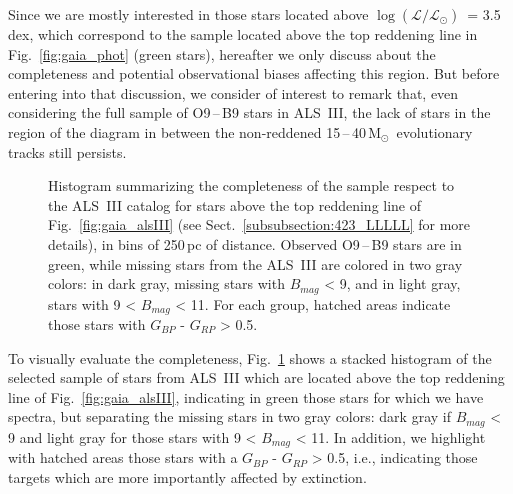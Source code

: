 \documentclass{aa}
\newcommand{\MSol}{\mbox{M$_\odot$}}
\newcommand{\logLs}{$\log (\mathcal{L}/\mathcal{L}_{\odot})$}
\begin{document}
Since we are mostly interested in those stars located above \logLs\ = 3.5\,dex, which correspond to the sample located above the top reddening line in Fig.~\ref{fig:gaia_phot} (green stars), hereafter we only discuss about the completeness and potential observational biases affecting this region. But before entering into that discussion, we consider of interest to remark that, even considering the full sample of O9\,--\,B9 stars in ALS~III, the lack of stars in the region of the diagram in between the non-reddened 15\,--\,40\,\MSol\ evolutionary tracks still persists. 

\begin{figure}[!t]
\centering
{}
\caption{Histogram summarizing the completeness of the sample respect to the ALS~III catalog for stars above the top reddening line of Fig.~\ref{fig:gaia_alsIII} (see Sect.~\ref{subsubsection:423_LLLLL} for more details), in bins of 250\,pc of distance. Observed O9\,--\,B9 stars are in green, while missing stars from the ALS~III are colored in two gray colors: in dark gray, missing stars with $B_{mag}$ < 9, and in light gray, stars with 9 < $B_{mag}$ < 11. For each group, hatched areas indicate those stars with $G_{BP}$ - $G_{RP}$ > 0.5.} 
\label{fig:hist_als}
\end{figure}

To visually evaluate the completeness, Fig.~\ref{fig:hist_als} shows a stacked histogram of the selected sample of stars from ALS~III which are located above the top reddening line of Fig.~\ref{fig:gaia_alsIII}, indicating in green those stars for which we have spectra, but separating the missing stars in two gray colors: dark gray if $B_{mag}$ < 9 and light gray for those stars with 9 < $B_{mag}$ < 11. In addition, we highlight with hatched areas those stars with a $G_{BP}$ - $G_{RP}$ > 0.5, i.e., indicating those targets which are more importantly affected by extinction.
\end{document}
